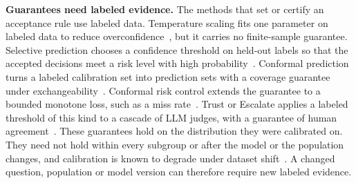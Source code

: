 \noindent\textbf{Guarantees need labeled evidence.} The methods that set or certify an acceptance rule use labeled data. Temperature scaling fits one parameter on labeled data to reduce overconfidence~\cite{guo2017calibration}, but it carries no finite-sample guarantee. Selective prediction chooses a confidence threshold on held-out labels so that the accepted decisions meet a risk level with high probability~\cite{geifman2017selective}. Conformal prediction turns a labeled calibration set into prediction sets with a coverage guarantee under exchangeability~\cite{angelopoulos2021gentle}. Conformal risk control extends the guarantee to a bounded monotone loss, such as a miss rate~\cite{angelopoulos2024conformal}. Trust or Escalate applies a labeled threshold of this kind to a cascade of LLM judges, with a guarantee of human agreement~\cite{jung2025trust}. These guarantees hold on the distribution they were calibrated on. They need not hold within every subgroup or after the model or the population changes, and calibration is known to degrade under dataset shift~\cite{ovadia2019can}. A changed question, population or model version can therefore require new labeled evidence.
